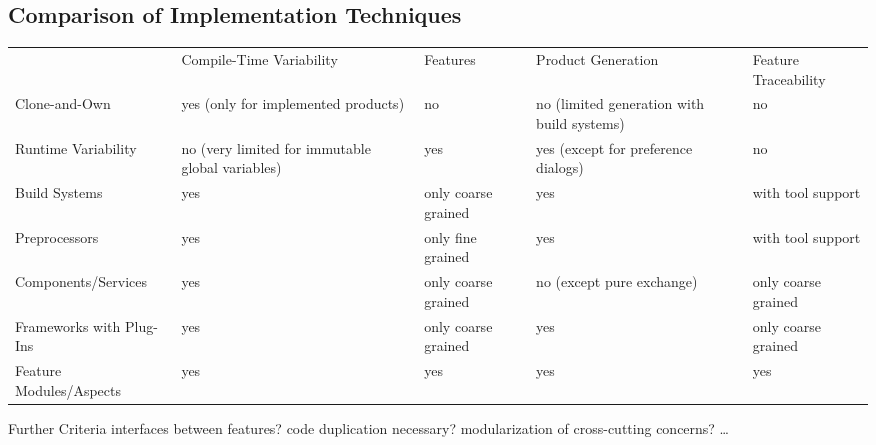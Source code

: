 \subsection{Comparison of Implementation Techniques}
\begin{frame}[fragile]{\myframetitle}
	\centering
	\renewcommand{\arraystretch}{1.2}
	\newcommand{\myexception}[1]{\tiny{}(#1)}
	\begin{tabular}{p{32mm}p{32mm}p{14mm}p{27mm}p{14mm}}
		 & Compile-Time Variability & Features & Product Generation & Feature \mbox{Traceability} \pause\\\rowcolor{gray}
		Clone-and-Own & yes \myexception{only for implemented products} & no & no \myexception{limited generation with build systems} & no \pause\\
		Runtime Variability & no \myexception{very limited for immutable global variables} & yes & yes \myexception{except for preference \mbox{dialogs}} & no \pause\\\rowcolor{gray}
		Build Systems & yes & only coarse grained & yes & with tool support \pause\\
		Preprocessors & yes & only fine grained & yes & with tool support \pause\\\rowcolor{gray}
		Components/Services & yes & only coarse grained & no \myexception{except pure exchange} & only coarse grained \pause\\
		Frameworks with Plug-Ins & yes & only coarse grained & yes & only coarse grained \pause\\\rowcolor{gray}
		Feature Modules/Aspects & yes & yes & yes & yes \pause\\
	\end{tabular}
	\begin{note}{Further Criteria}
		interfaces between features? code duplication necessary? modularization of cross-cutting concerns? \ldots
	\end{note}
\end{frame}


